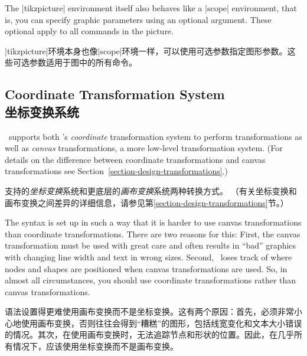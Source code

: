%
\begin{codeexample}[]
\begin{tikzpicture}
  \begin{scope}[color=red]
    \draw (0mm,10mm) -- (10mm,10mm);
    \draw (0mm, 8mm) -- (10mm, 8mm);
    \draw (0mm, 6mm) -- (10mm, 6mm);
  \end{scope}
  \begin{scope}[color=green]
    \draw             (0mm, 4mm) -- (10mm, 4mm);
    \draw             (0mm, 2mm) -- (10mm, 2mm);
    \draw[color=blue] (0mm, 0mm) -- (10mm, 0mm);
  \end{scope}
\end{tikzpicture}
\end{codeexample}

The |{tikzpicture}| environment itself also behaves like a |{scope}|
environment, that is, you can specify graphic parameters using an optional
argument. These optional apply to all commands in the picture.

|{tikzpicture}|环境本身也像|{scope}|环境一样，可以使用可选参数指定图形参数。这些可选参数适用于图中的所有命令。


\subsection{Coordinate Transformation System\\坐标变换系统}

\tikzname\ supports both \pgfname's \emph{coordinate} transformation system to
perform transformations as well as \emph{canvas} transformations, a more
low-level transformation system. (For details on the difference between
coordinate transformations and canvas transformations see
Section~\ref{section-design-transformations}.)


\tikzname{}支持\pgfname{}的\emph{坐标变换}系统和更底层的\emph{画布变换}系统两种转换方式。 （有关坐标变换和画布变换之间差异的详细信息，请参见第\ref{section-design-transformations}节。）

The syntax is set up in such a way that it is harder to use canvas
transformations than coordinate transformations. There are two reasons for
this: First, the canvas transformation must be used with great care and often
results in ``bad'' graphics with changing line width and text in wrong sizes.
Second, \pgfname\ loses track of where nodes and shapes are positioned when
canvas transformations are used. So, in almost all circumstances, you should
use coordinate transformations rather than canvas transformations.

语法设置得更难使用画布变换而不是坐标变换。这有两个原因：首先，必须非常小心地使用画布变换，否则往往会得到“糟糕”的图形，包括线宽变化和文本大小错误的情况。其次，在使用画布变换时，\pgfname{}无法追踪节点和形状的位置。因此，在几乎所有情况下，应该使用坐标变换而不是画布变换。

